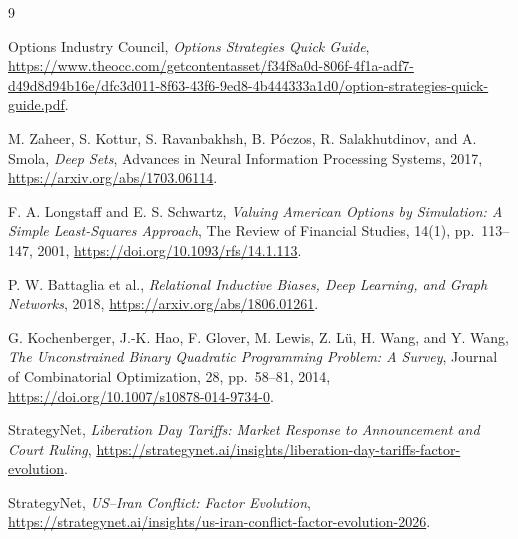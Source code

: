 \documentclass{strategynet-journal}
\begin{document}
\begin{thebibliography}{9}

Options Industry Council,
\emph{Options Strategies Quick Guide},
\url{https://www.theocc.com/getcontentasset/f34f8a0d-806f-4f1a-adf7-d49d8d94b16e/dfc3d011-8f63-43f6-9ed8-4b444333a1d0/option-strategies-quick-guide.pdf}.

M. Zaheer, S. Kottur, S. Ravanbakhsh, B. Póczos, R. Salakhutdinov, and
A. Smola,
\emph{Deep Sets},
Advances in Neural Information Processing Systems, 2017,
\url{https://arxiv.org/abs/1703.06114}.

F. A. Longstaff and E. S. Schwartz,
\emph{Valuing American Options by Simulation: A Simple Least-Squares
Approach},
The Review of Financial Studies, 14(1), pp.~113--147, 2001,
\url{https://doi.org/10.1093/rfs/14.1.113}.

P. W. Battaglia et al.,
\emph{Relational Inductive Biases, Deep Learning, and Graph Networks},
2018,
\url{https://arxiv.org/abs/1806.01261}.

G. Kochenberger, J.-K. Hao, F. Glover, M. Lewis, Z. Lü, H. Wang, and Y. Wang,
\emph{The Unconstrained Binary Quadratic Programming Problem: A Survey},
Journal of Combinatorial Optimization, 28, pp.~58--81, 2014,
\url{https://doi.org/10.1007/s10878-014-9734-0}.

StrategyNet,
\emph{Liberation Day Tariffs: Market Response to Announcement and Court
Ruling},
\url{https://strategynet.ai/insights/liberation-day-tariffs-factor-evolution}.

StrategyNet,
\emph{US--Iran Conflict: Factor Evolution},
\url{https://strategynet.ai/insights/us-iran-conflict-factor-evolution-2026}.

\end{thebibliography}
\end{document}
